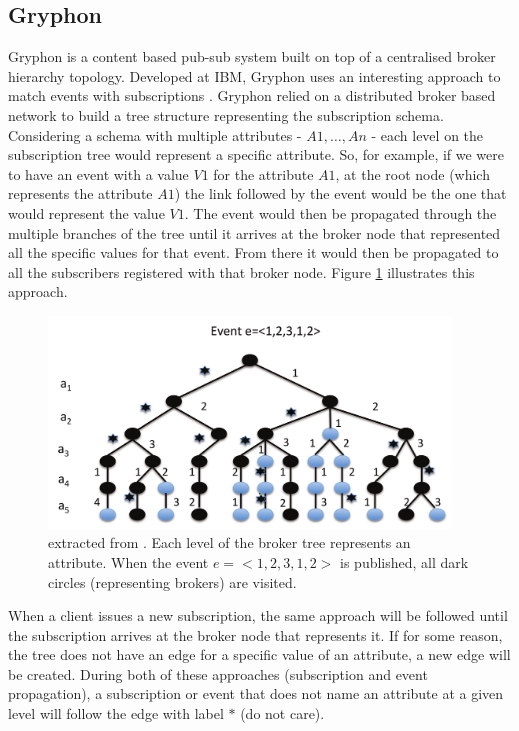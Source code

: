 \subsection{Gryphon}\label{gryphon}

Gryphon \cite{Strom1998} is a content based pub-sub system
built on top of a centralised broker hierarchy topology. Developed at
IBM, Gryphon uses an interesting approach to match events with
subscriptions \cite{Aguilera1999}. Gryphon relied on a distributed broker based
network to build a tree structure representing the
subscription schema. Considering a schema with multiple attributes -
$A1,\ldots{},An$ - each level on the subscription tree would represent a
specific attribute. So, for example, if we were to have an event with a
value $V1$ for the attribute $A1$, at the root node (which represents the
attribute $A1$) the link followed by the event would be the one that would
represent the value $V1$. The event would then be propagated through the
multiple branches of the tree until it arrives at the broker node that
represented all the specific values for that event. From there it would
then be propagated to all the subscribers registered with that broker
node. Figure \ref{fig:gryphon} illustrates this approach.

\begin{figure}[hb!]
  \centering
  \includegraphics[width=0.95\textwidth]{img/gryphon.png}
  \caption{extracted from \cite{Kermarrec2013}. Each level of the broker tree represents an attribute.
  When the event $e = <1, 2, 3, 1, 2>$ is published,
  all dark circles (representing brokers) are visited.}
  \label{fig:gryphon}
\end{figure}

When a client issues a new subscription, the same approach will be
followed until the subscription arrives at the broker node that
represents it. If for some reason, the tree does not have an edge for a
specific value of an attribute, a new edge will be created. During both
of these approaches (subscription and event propagation), a subscription
or event that does not name an attribute at a given level will follow
the edge with label $*$ (do not care).

